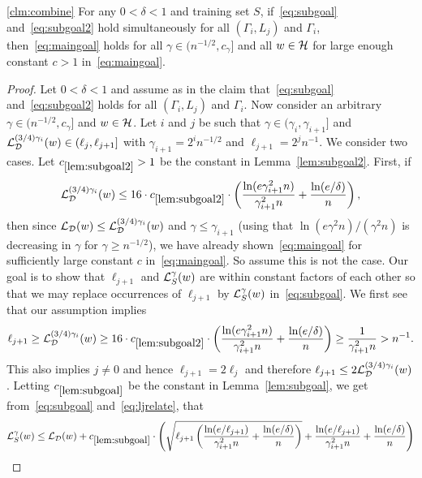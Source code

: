 \begin{customclm}{\ref{clm:combine}}
    For any $0 < \delta < 1$ and training set $S$, if~\eqref{eq:subgoal} and~\eqref{eq:subgoal2} hold simultaneously for all $(\Gamma_i, L_j)$ and $\Gamma_i$, then~\eqref{eq:maingoal} holds for all $\gamma \in (n^{-1/2}, c_\gamma]$ and all $w \in \mathcal{H}$ for large enough constant $c>1$ in~\eqref{eq:maingoal}.
\end{customclm}
\begin{proof}
Let $0 < \delta < 1$ and assume as in the claim that~\eqref{eq:subgoal} and~\eqref{eq:subgoal2} holds for all $(\Gamma_i, L_j)$ and $\Gamma_i$. Now consider an arbitrary $\gamma \in (n^{-1/2},c_\gamma]$ and $w \in \mathcal{H}$. Let $i$ and $j$ be such that $\gamma \in (\gamma_i, \gamma_{i+1}]$ and $\mathcal{L}^{(3/4)\gamma_{i}}_{\mathcal{D}}(w) \in (\ell_j, \ell_{j+1}]$ with $\gamma_{i+1}=2^i n^{-1/2}$ and $\ell_{j+1} = 2^j n^{-1}$. We consider two cases. Let $c_{\ref{lem:subgoal2}}>1$ be the constant in Lemma~\ref{lem:subgoal2}. First, if 
\[
\mathcal{L}_{\mathcal{D}}^{(3/4)\gamma_{i}}(w) \leq 16 \cdot c_{\ref{lem:subgoal2}} \cdot \left(\frac{\ln(e\gamma_{i+1}^2 n)}{\gamma_{i+1}^2 n} + \frac{\ln(e/\delta)}{n} \right),
\]
then since $\mathcal{L}_{\mathcal{D}}(w) \leq \mathcal{L}_{\mathcal{D}}^{(3/4)\gamma_{i}}(w)$ and $\gamma \leq \gamma_{i+1}$ (using that $\ln(e \gamma^2 n)/(\gamma^2 n)$ is decreasing in $\gamma$ for $\gamma \geq n^{-1/2}$), we have already shown~\eqref{eq:maingoal} for sufficiently large constant $c$ in~\eqref{eq:maingoal}. So assume this is not the case. Our goal is to show that $\ell_{j+1}$ and $\mathcal{L}_S^\gamma(w)$ are within constant factors of each other so that we may replace occurrences of $\ell_{j+1}$ by $\mathcal{L}_S^\gamma(w)$ in~\eqref{eq:subgoal}. We first see that our assumption implies
\begin{align}
\ell_{j+1} \geq \mathcal{L}_{\mathcal{D}}^{(3/4)\gamma_{i}}(w) \geq 16 \cdot c_{\ref{lem:subgoal2}} \cdot \left(\frac{\ln(e\gamma_{i+1}^2 n)}{\gamma_{i+1}^2 n} + \frac{\ln(e/\delta)}{n} \right) \geq   \frac{1}{\gamma_{i+1}^2 n} > n^{-1}.\label{eq:ljrelate}
\end{align}
This also implies $j \neq 0$ and hence $\ell_{j+1}=2\ell_j$ and therefore $\ell_{j+1} \leq 2 \mathcal{L}_{\mathcal{D}}^{(3/4)\gamma_{i}}(w)$. Letting $c_{\ref{lem:subgoal}}$ be the constant in Lemma~\ref{lem:subgoal}, we get from~\eqref{eq:subgoal} and~\eqref{eq:ljrelate}, that
\begin{align*}
    \Loss^\gamma_S(w) &\leq \Loss_\cD(w) + c_{\ref{lem:subgoal}} \cdot \left(\sqrt{\ell_{j+1}\left( \frac{ \ln(e/\ell_{j+1})}{\gamma_{i+1}^2 n} + \frac{\ln(e/\delta)}{n} \right)} + \frac{\ln(e/\ell_{j+1})}{\gamma_{i+1}^2 n} + \frac{\ln(e/\delta)}{n} \right) \\

\end{align*}
\end{proof}

